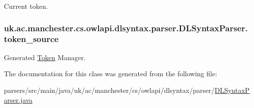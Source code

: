 Current token. \hypertarget{classuk_1_1ac_1_1manchester_1_1cs_1_1owlapi_1_1dlsyntax_1_1parser_1_1_d_l_syntax_parser_a1075f2322122dfb14235b03eaaf2c79c}{
\subsubsection[{token\-\_\-source}]{ uk.\-ac.\-manchester.\-cs.\-owlapi.\-dlsyntax.\-parser.\-D\-L\-Syntax\-Parser.\-token\-\_\-source}}\label{classuk_1_1ac_1_1manchester_1_1cs_1_1owlapi_1_1dlsyntax_1_1parser_1_1_d_l_syntax_parser_a1075f2322122dfb14235b03eaaf2c79c}
Generated \hyperlink{classuk_1_1ac_1_1manchester_1_1cs_1_1owlapi_1_1dlsyntax_1_1parser_1_1_token}{Token} Manager. 

The documentation for this class was generated from the following file\-:\begin{DoxyCompactItemize}
\item 
parsers/src/main/java/uk/ac/manchester/cs/owlapi/dlsyntax/parser/\hyperlink{_d_l_syntax_parser_8java}{D\-L\-Syntax\-Parser.\-java}\end{DoxyCompactItemize}
